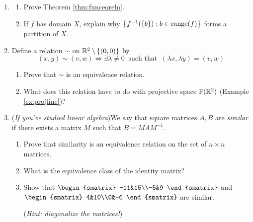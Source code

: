 \begin{exercises}{}{}
\begin{enumerate}
		
		\item\begin{enumerate}
		  \item Prove Theorem \ref{thm:funceqreln}.
		  \item If $f$ has domain $X$, explain why $\bigl\{f^{-1}(\{b\}):b\in\operatorname{range}(f)\bigr\}$ forms a partition of $X$.
		\end{enumerate}
		
	  
		\item Define a relation $\sim$ on $\mathbb{R}^2\setminus\{(0,0)\}$ by
		\[
			(x,y)\sim (v,w)\iff \exists\lambda\neq 0\ \text{ such that }\ (\lambda x,\lambda y)=(v,w)
		\]
		\begin{enumerate}
		  \item Prove that $\sim$ is an equivalence relation.
		  \item What does this relation have to do with projective space $\mathbb{P}(\mathbb{R}^2)$ (Example \ref{ex:projline})?
		\end{enumerate}
	  
	
	
	  \item (\emph{If you've studied linear algebra})\lstsp We say that square matrices $A,B$ are \emph{similar} if there exists a matrix $M$ such that $B=MAM^{-1}$.
	  \begin{enumerate}
	    \item Prove that similarity is an equivalence relation on the set of $n\times n$ matrices.
	    \item What is the equivalence class of the identity matrix?
	    \item Show that 
	   	$\begin{smatrix}
	    	-11&15\\-5&9
	    \end{smatrix}$
			and
			$\begin{smatrix}
	    	4&10\\0&-6
	    \end{smatrix}$
	    are similar.
	    \par
	    (\emph{Hint: diagonalize the matrices!})
		\end{enumerate}

	\end{enumerate}
\end{exercises}


